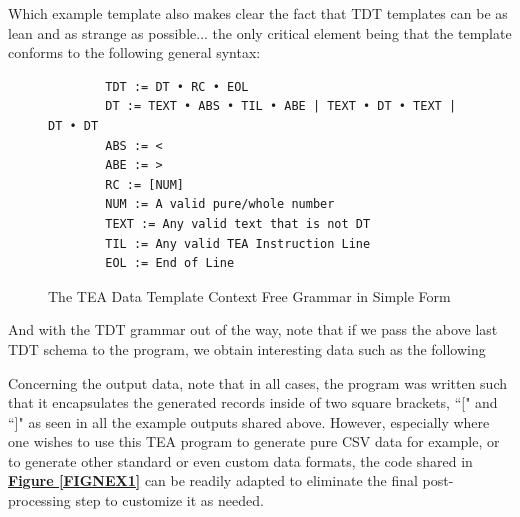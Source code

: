 \documentclass[a4paper, 18pt]{book} %
\begin{document}
Which example template also makes clear the fact that TDT templates can be as lean and as strange as possible... the only critical element being that the template conforms to the following general syntax:


   \begin{figure}[H]
  \centering
  \begin{tcolorbox}[myterminalstyle, title=TEA Data Template (Simple Grammar)]
  \begin{verbatim}
	    TDT := DT • RC • EOL
	    DT := TEXT • ABS • TIL • ABE | TEXT • DT • TEXT | DT • DT
	    ABS := <
	    ABE := >
	    RC := [NUM]
	    NUM := A valid pure/whole number
	    TEXT := Any valid text that is not DT
	    TIL := Any valid TEA Instruction Line
	    EOL := End of Line
  \end{verbatim}
  \end{tcolorbox}
  \caption{The TEA Data Template Context Free Grammar in Simple Form}
  \label{FIGNTDT}
\end{figure}
 
 
 \vspace{2em}
 
 
 And with the TDT grammar out of the way, note that if we pass the above last TDT schema to the program, we obtain interesting data such as the following
 
 
    \begin{tcbverbatim}
  \end{tcbverbatim} 
 
 
 \vspace{2em}
 
 Concerning the output data, note that in all cases, the program was written such that it encapsulates the generated records inside of two square brackets, ``[" and ``]" as seen in all the example outputs shared above. However, especially where one wishes to use this TEA program to generate pure CSV data for example, or to generate other standard or even custom data formats, the code shared in \textbf{\hyperref[FIGNEX1]{Figure \ref{FIGNEX1}}} can be readily adapted to eliminate the final post-processing step to customize it as needed.
 
 
 \vspace{2em}
 
\end{document}
